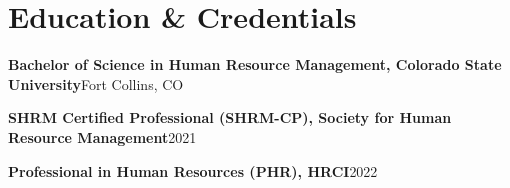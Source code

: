 \documentclass[10pt,letterpaper]{article}
\newcommand{\credential}[2]{%
  \textbf{#1}\hfill\textcolor{slate}{#2}\par
}
\begin{document}
\section*{Education \& Credentials}
\credential{Bachelor of Science in Human Resource Management, Colorado State University}{Fort Collins, CO}
\vspace{2pt}
\credential{SHRM Certified Professional (SHRM-CP), Society for Human Resource Management}{2021}
\credential{Professional in Human Resources (PHR), HRCI}{2022}
\end{document}

